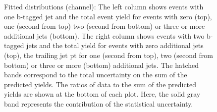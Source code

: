 \begin{figure}[htbp!]
\begin{center}

\caption{Fitted distributions (\mumu channel): 
  The left column shows events with one b-tagged jet and the total event yield for events with zero (top), one (second from top)
  two (second from bottom) or three or more additional jets (bottom).
  The right column shows events with two b-tagged jets and the total yield for events with zero additional jets (top),
  the trailing jet pt for one (second from top),
  two (second from bottom) or three or more (bottom) additional jets.
  The hatched bands correspond to the total uncertainty on the sum of
  the predicted yields. The ratios of data to the sum of the
  predicted yields are shown at the bottom of each plot. Here, the solid
  gray band represents the contribution of the statistical uncertainty.  
       \label{fig:lh_mumu_postfitdistr8}}
  \end{center}
\end{figure}

